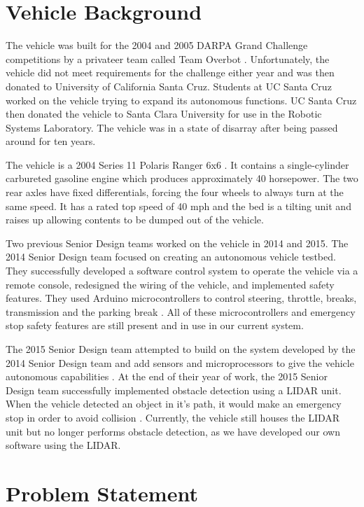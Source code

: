 \section{Vehicle Background}
The vehicle was built for the 2004 and 2005 DARPA Grand Challenge competitions by a privateer team called Team Overbot \cite{rslrover2014}.  Unfortunately, the vehicle did not meet requirements for the challenge either year and was then donated to University of California Santa Cruz.  Students at UC Santa Cruz worked on the vehicle trying to expand its autonomous functions.   UC Santa Cruz then donated the vehicle to Santa Clara University for use in the Robotic Systems Laboratory.  The vehicle was in a state of disarray after being passed around for ten years.  

The vehicle is a 2004 Series 11 Polaris Ranger 6x6 \cite{rslrover2014}.  It contains a single-cylinder carbureted gasoline engine which produces approximately 40 horsepower.  The two rear axles have fixed differentials, forcing the four wheels to always turn at the same speed.  It has a rated top speed of 40 mph and the bed is a tilting unit and raises up allowing contents to be dumped out of the vehicle.  

Two previous Senior Design teams worked on the vehicle in 2014 and 2015.  The 2014 Senior Design team focused on creating an autonomous vehicle testbed.  They successfully developed a software control system to operate the vehicle via a remote console, redesigned the wiring of the vehicle, and implemented safety features.  They used Arduino microcontrollers to control steering, throttle, breaks, transmission and the parking break \cite{rslrover2014}.  All of these microcontrollers and emergency stop safety features are still present and in use in our current system.

The 2015 Senior Design team attempted to build on the system developed by the 2014 Senior Design team and add sensors and microprocessors to  give the vehicle autonomous capabilities \cite{rslrover2015}.  At the end of their year of work, the 2015 Senior Design team successfully implemented obstacle detection using a LIDAR unit.  When the vehicle detected an object in it's path, it would make an emergency stop in order to avoid collision \cite{rslrover2015}. Currently, the vehicle still houses the LIDAR unit but no longer performs obstacle detection, as we have developed our own software using the LIDAR. 

\section{Problem Statement}

